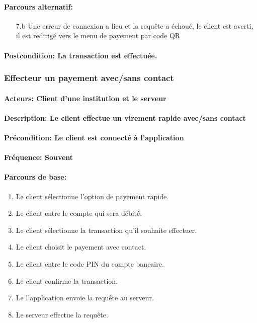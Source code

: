 \documentclass[../annexe.tex]{subfiles}
\begin{document}
            \paragraph{Parcours alternatif:} 
        \begin{itemize}
            \item[7.b] Une erreur de connexion a lieu et la requête a échoué, le client est averti,
            il est redirigé vers le menu de payement par code QR
        \end{itemize} 
        \paragraph{Postcondition: La transaction est effectuée.}
\newpage
  
        \subsubsection{Effecteur un payement avec/sans contact }
  
        \paragraph{Acteurs: Client d’une institution et le serveur}
        \paragraph{Description: Le client effectue un virement rapide avec/sans contact}
        \paragraph{Précondition: Le client est connecté à l’application}
        \paragraph{Fréquence: Souvent}
        \paragraph{Parcours de base: }
        \begin{enumerate}
            \item  Le client sélectionne l’option de payement rapide.
            \item  Le client entre le compte qui sera débité.
            \item  Le client sélectionne la transaction qu’il souhaite effectuer.
            \item  Le client choisit le payement avec contact.
            \item  Le client entre le code PIN du compte bancaire.
            \item  Le client confirme la transaction.
            \item  Le l’application envoie la requête au serveur.
            \item  Le serveur effectue la requête.
        \end{enumerate}
\end{document}
